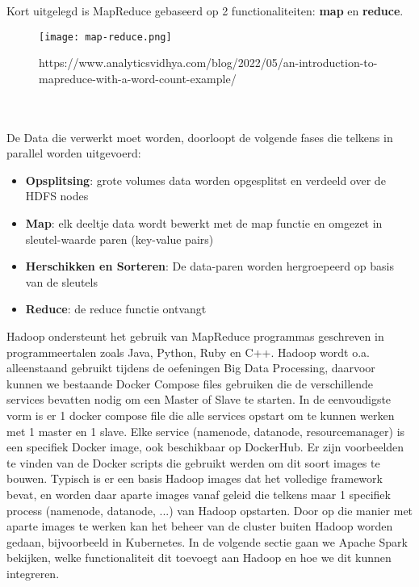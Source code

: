 Kort uitgelegd is MapReduce gebaseerd op 2 functionaliteiten: \textbf{map} en \textbf{reduce}.
\newline
\newline
\begin{figure}
    \texttt{[image: map-reduce.png]}
    \caption{https://www.analyticsvidhya.com/blog/2022/05/an-introduction-to-mapreduce-with-a-word-count-example/}
\end{figure}
\\
\\
De Data die verwerkt moet worden, doorloopt de volgende fases die telkens in parallel worden uitgevoerd:
\begin{itemize}
    \item \textbf{Opsplitsing}: grote volumes data worden opgesplitst en verdeeld over de HDFS nodes
    \item \textbf{Map}: elk deeltje data wordt bewerkt met de map functie en omgezet in sleutel-waarde paren (key-value pairs)
    \item \textbf{Herschikken en Sorteren}: De data-paren worden hergroepeerd op basis van de sleutels
    \item \textbf{Reduce}: de reduce functie ontvangt 
\end{itemize}

Hadoop ondersteunt het gebruik van MapReduce programmas geschreven in programmeertalen zoals Java, Python, Ruby en C++.
\autocite{Taylor2023}
\newline
\newline
Hadoop wordt o.a. alleenstaand gebruikt tijdens de oefeningen Big Data Processing, daarvoor kunnen we bestaande Docker Compose files gebruiken die de verschillende services bevatten nodig om een Master of Slave te starten.
In de eenvoudigste vorm is er 1 docker compose file die alle services opstart om te kunnen werken met 1 master en 1 slave.
\newline
\newline
Elke service (namenode, datanode, resourcemanager) is een specifiek Docker image, ook beschikbaar op DockerHub. Er zijn voorbeelden te vinden van de Docker scripts die gebruikt werden om dit soort images te bouwen. Typisch is er een basis Hadoop images dat het volledige framework bevat, en worden daar aparte images vanaf geleid die telkens maar 1 specifiek process (namenode, datanode, ...) van Hadoop opstarten.
Door op die manier met aparte images te werken kan het beheer van de cluster buiten Hadoop worden gedaan, bijvoorbeeld in Kubernetes.
\newline
\newline
In de volgende sectie gaan we Apache Spark bekijken, welke functionaliteit dit toevoegt aan Hadoop en hoe we dit kunnen integreren.
\newline
\newline

